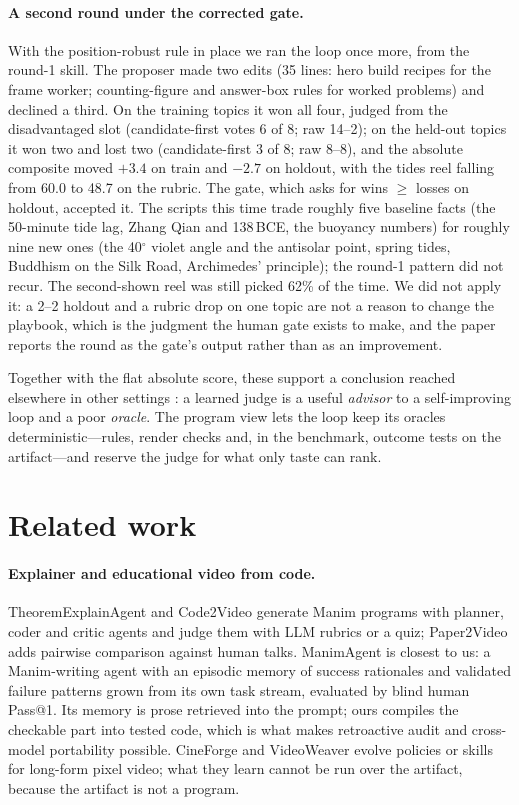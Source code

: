 \documentclass[11pt]{article}
\begin{document}
\paragraph{A second round under the corrected gate.} With the position-robust rule in place we ran
the loop once more, from the round-1 skill. The proposer made two edits (35 lines: hero build recipes
for the frame worker; counting-figure and answer-box rules for worked problems) and declined a third.
On the training topics it won all four, judged from the disadvantaged slot (candidate-first votes 6 of
8; raw 14--2); on the held-out topics it won two and lost two (candidate-first 3 of 8; raw 8--8), and the
absolute composite moved $+3.4$ on train and $-2.7$ on holdout, with the tides reel falling from 60.0
to 48.7 on the rubric. The gate, which asks for wins $\geq$ losses on holdout, accepted it. The scripts
this time trade roughly five baseline facts (the 50-minute tide lag, Zhang Qian and 138\,BCE, the
buoyancy numbers) for roughly nine new ones (the 40$^\circ$ violet angle and the antisolar point,
spring tides, Buddhism on the Silk Road, Archimedes' principle); the round-1 pattern did not recur. The
second-shown reel was still picked 62\% of the time. We did not apply it: a 2--2 holdout and a rubric
drop on one topic are not a reason to change the playbook, which is the judgment the human gate exists
to make, and the paper reports the round as the gate's output rather than as an improvement.

Together with the flat absolute score, these support a conclusion reached elsewhere in other
settings \citep{notanoracle2026,moreconvincing2026,teachingmonster2026}: a learned judge is a useful
\emph{advisor} to a self-improving loop and a poor \emph{oracle}. The program view lets the loop keep
its oracles deterministic---rules, render checks and, in the benchmark, outcome tests on the
artifact---and reserve the judge for what only taste can rank.

\section{Related work}

\paragraph{Explainer and educational video from code.} TheoremExplainAgent \citep{theoremexplain2025}
and Code2Video \citep{code2video2026} generate Manim programs with planner, coder and critic agents
and judge them with LLM rubrics or a quiz; Paper2Video \citep{paper2video2025} adds pairwise
comparison against human talks. ManimAgent \citep{manimagent2026} is closest to us: a Manim-writing
agent with an episodic memory of success rationales and validated failure patterns grown from its own
task stream, evaluated by blind human Pass@1. Its memory is prose retrieved into the prompt; ours
compiles the checkable part into tested code, which is what makes retroactive audit and cross-model
portability possible. CineForge \citep{cineforge2026} and VideoWeaver \citep{videoweaver2026} evolve
policies or skills for long-form pixel video; what they learn cannot be run over the artifact,
because the artifact is not a program.
\end{document}
